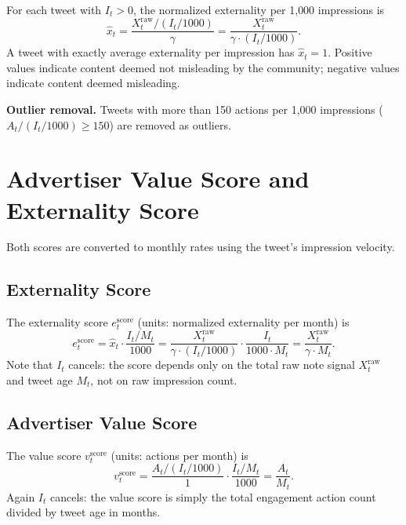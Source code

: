 \documentclass[11pt]{article}
\begin{document}
For each tweet with $I_t > 0$, the normalized externality per 1{,}000 impressions is
\begin{equation}
    \hat{x}_t
    = \frac{X_t^{\text{raw}} / (I_t / 1000)}{\gamma}
    = \frac{X_t^{\text{raw}}}{\gamma \cdot (I_t / 1000)}.
    \label{eq:hat_x}
\end{equation}
A tweet with exactly average externality per impression has $\hat{x}_t = 1$.
Positive values indicate content deemed not misleading by the community;
negative values indicate content deemed misleading.

\noindent
\textbf{Outlier removal.} Tweets with more than 150 actions per 1{,}000 impressions
($A_t / (I_t / 1000) \geq 150$) are removed as outliers.

\section{Advertiser Value Score and Externality Score}

Both scores are converted to monthly rates using the tweet's impression velocity.

\subsection{Externality Score}

The externality score $e_t^{\text{score}}$ (units: normalized externality per month) is
\begin{equation}
    e_t^{\text{score}}
    = \hat{x}_t \cdot \frac{I_t / M_t}{1000}
    = \frac{X_t^{\text{raw}}}{\gamma \cdot (I_t/1000)} \cdot \frac{I_t}{1000 \cdot M_t}
    = \frac{X_t^{\text{raw}}}{\gamma \cdot M_t}.
    \label{eq:e_score}
\end{equation}
Note that $I_t$ cancels: the score depends only on the total raw note signal $X_t^{\text{raw}}$
and tweet age $M_t$, not on raw impression count.

\subsection{Advertiser Value Score}

The value score $v_t^{\text{score}}$ (units: actions per month) is
\begin{equation}
    v_t^{\text{score}}
    = \frac{A_t / (I_t / 1000)}{1} \cdot \frac{I_t / M_t}{1000}
    = \frac{A_t}{M_t}.
    \label{eq:v_score}
\end{equation}
Again $I_t$ cancels: the value score is simply the total engagement action count divided
by tweet age in months.
\end{document}
